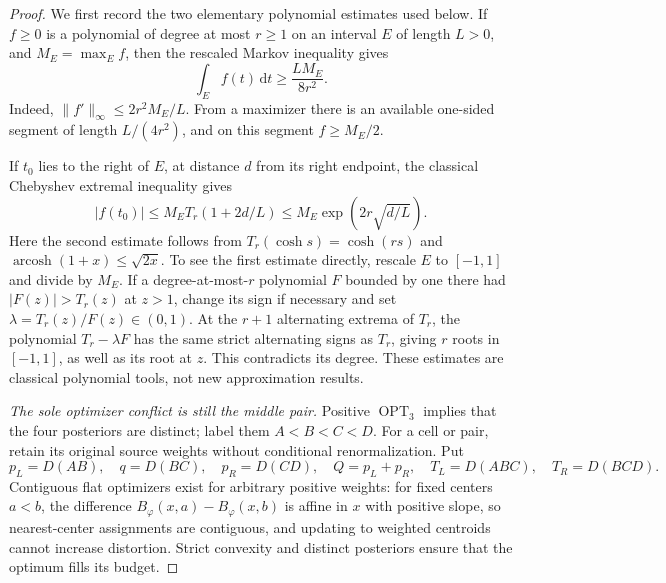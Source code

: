 \begin{proof}
We first record the two elementary polynomial estimates used below. If
$f\ge0$ is a polynomial of degree at most $r\ge1$ on an interval $E$ of
length $L>0$, and $M_E=\max_E f$, then the rescaled Markov inequality gives
\begin{equation}
 \int_E f(t)\,\mathrm dt\ge\frac{L M_E}{8r^2}.
 \label{eq:weighted-markov-mass}
\end{equation}
Indeed, $\|f'\|_\infty\le2r^2M_E/L$. From a maximizer there is an
available one-sided segment of length $L/(4r^2)$, and on this segment
$f\ge M_E/2$.

If $t_0$ lies to the right of $E$, at distance $d$ from its right endpoint,
the classical Chebyshev extremal inequality gives
\begin{equation}
 |f(t_0)|\le M_E T_r(1+2d/L)
 \le M_E\exp\left(2r\sqrt{d/L}\right).
 \label{eq:weighted-cheb-extrapolation}
\end{equation}
Here the second estimate follows from
$T_r(\cosh s)=\cosh(rs)$ and
$\operatorname{arcosh}(1+x)\le\sqrt{2x}$. To see the first estimate
directly, rescale $E$ to $[-1,1]$ and divide by $M_E$. If a degree-at-most-$r$
polynomial $F$ bounded by one there had
$|F(z)|>T_r(z)$ at $z>1$, change its sign if necessary and set
$\lambda=T_r(z)/F(z)\in(0,1)$. At the $r+1$ alternating extrema of $T_r$,
the polynomial $T_r-\lambda F$ has the same strict alternating signs as
$T_r$, giving $r$ roots in $[-1,1]$, as well as its root at $z$.
This contradicts its degree. These estimates are classical polynomial
tools, not new approximation results.

\emph{The sole optimizer conflict is still the middle pair.}
Positive $\operatorname{OPT}_3$ implies that the four posteriors are
distinct; label them $A<B<C<D$. For a cell or pair, retain its original
source weights without conditional renormalization. Put
\[
 p_L=D(AB),\quad q=D(BC),\quad p_R=D(CD),\quad
 Q=p_L+p_R,\quad T_L=D(ABC),\quad T_R=D(BCD).
\]
Contiguous flat optimizers exist for arbitrary positive weights: for fixed
centers $a<b$, the difference $B_\varphi(x,a)-B_\varphi(x,b)$ is affine
in $x$ with positive slope, so nearest-center assignments are contiguous,
and updating to weighted centroids cannot increase distortion. Strict
convexity and distinct posteriors ensure that the optimum fills its budget.


\end{proof}

